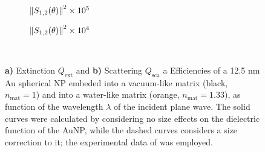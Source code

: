 \begin{figure}[h!]
	\def\svgwidth{1\textwidth} \small
\vspace*{3.25em}
\hspace*{-6.5em}
\begin{subfigure}{.49\textwidth}\caption{$\norm{S_{1,2}(\theta)}^2\times 10^5$}\label{fig:Mieefficiencies:a}\end{subfigure}
\begin{subfigure}{.49\textwidth}\caption{$\norm{S_{1,2}(\theta)}^2\times 10^4$}\label{fig:Mieefficiencies:b}\end{subfigure}
\vspace*{-6.25em}\\
\vspace*{-2em}
\caption[Extinction and Scattering Corss Section of a 12.5 nm Au spherical NP embeded into a vacuum- and into a waterlike environment]{ \textbf{a)} Extinction $Q_\text{ext}$ and \textbf{b)} Scattering $Q_\text{sca}$ a Efficiencies of a 12.5 nm Au spherical NP embeded into a vacuum-like matrix (black, $n_\text{mat} = 1$)  and into a water-like matrix (orange, $n_\text{mat} = 1.33$), as function of  the wavelength $\lambda$ of the incident plane wave.  The solid curves were calculated by considering no size effects on the dielectric function of the AuNP, while the dashed curves considers a size correction to it; the experimental data of \citeauthor{johnson_optical_1972} \cite{johnson_optical_1972} was employed.}
 \end{figure}
